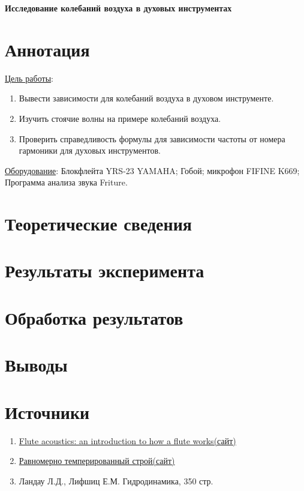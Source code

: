 
\begin{center}
\Large{\textbf{Исследование колебаний воздуха в духовых инструментах}}
\end{center}

\section{Аннотация}
\underline{Цель работы}: 
\begin{enumerate}
    \item Вывести зависимости для колебаний воздуха в духовом инструменте.
    \item Изучить стоячие волны на примере колебаний воздуха.
    \item Проверить справедливость формулы для зависимости частоты от номера гармоники для духовых инструментов.
\end{enumerate} \par
\underline{Оборудование}: Блокфлейта YRS-23 YAMAHA; Гобой; микрофон FIFINE K669; Программа анализа звука Friture.

\section{Теоретические сведения}

\section{Результаты эксперимента}

\section{Обработка результатов}

\section{Выводы}

\section{Источники}

\begin{enumerate}
    \item \href{https://newt.phys.unsw.edu.au/jw/fluteacoustics.html}{Flute acoustics: an introduction to how a flute works(сайт)}
    \item \href{https://ru.wikipedia.org/wiki/Равномерно_темперированный_строй}{Равномерно темперированный строй(сайт)}
    \item Ландау Л.Д., Лифшиц Е.М. Гидродинамика, 350 стр.
\end{enumerate}

\newpage
